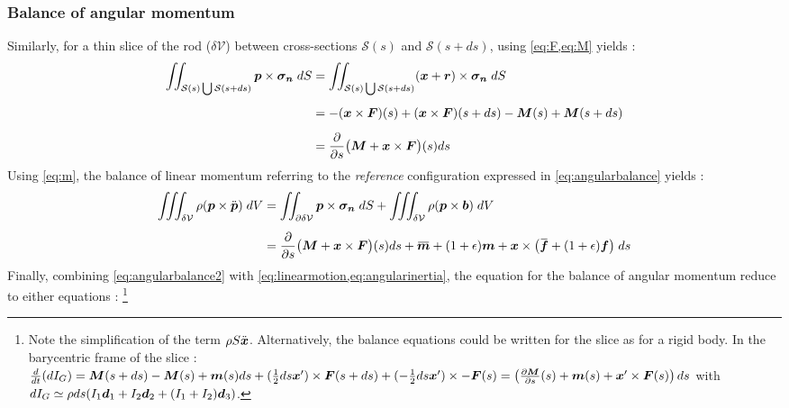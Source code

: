 \subsubsection{Balance of angular momentum}
Similarly, for a thin slice of the rod ($\delta\mathcal{V}$) between cross-sections $\mathcal{S}(s)$ and $\mathcal{S}(s+ds)$, using \cref{eq:F,eq:M} yields : 
\begin{equation}
	\begin{aligned}
		\iint_{\mathcal{S}(s) \bigcup \mathcal{S}(s+ds)} \boldsymbol{p} \times \boldsymbol{\sigma_n} \;dS
		&= \iint_{\mathcal{S}(s) \bigcup \mathcal{S}(s+ds)} (\boldsymbol{x} + \boldsymbol{r}) \times \boldsymbol{\sigma_n} \;dS
		\\[0.5em]
		&= -(\boldsymbol{x}\times\boldsymbol{F})(s) + (\boldsymbol{x}\times\boldsymbol{F})(s+ds) - \boldsymbol{M}(s) + \boldsymbol{M}(s+ds)
		\\[0.5em]
		&=  \frac{\partial}{\partial s} \big( \boldsymbol{M} + \boldsymbol{x}\times\boldsymbol{F} \big)(s) ds
	\end{aligned}
\end{equation}
Using \cref{eq:m}, the balance of linear momentum referring to the \emph{reference} configuration expressed in \cref{eq:angularbalance} yields : 
\begin{equation}
	\label{eq:angularbalance2}
	\begin{aligned}
		\iiint_{\delta\mathcal{V}} \rho (\vect{p} \times \ddot{\vect{p}}) \;dV  
		&=  \iint_{\partial\delta\mathcal{V}} \vect{p} \times \vect{\sigma_n} \;dS 
		+ \iiint_{\delta\mathcal{V}} \rho (\vect{p} \times \vect{b}) \;dV
		\\[0.5em]
		&= \frac{\partial}{\partial s} \big( \vect{M} + \vect{x}\times\vect{F} \big)(s) ds 
		+ \overbar{\vect{m}} + (1+\epsilon) \vect{m} + \vect{x} \times \big(\overbar{\vect{f}} + (1+\epsilon) \vect{f} \big) \;ds 
	\end{aligned}
\end{equation}
Finally, combining \cref{eq:angularbalance2} with \cref{eq:linearmotion,eq:angularinertia}, the equation for the balance of angular momentum reduce to either equations : \footnote{Note the simplification of the term $\rho S \ddot{\boldsymbol{x}}$. Alternatively, the balance equations could be written for the slice as for a rigid body. In the barycentric frame of the slice : $\frac{d}{dt}(dI_G) = \boldsymbol{M}(s+ds)-\boldsymbol{M}(s) + \boldsymbol{m}(s)ds + (\tfrac{1}{2}ds\boldsymbol{x}')\times \boldsymbol{F}(s+ds) + (-\tfrac{1}{2}ds\boldsymbol{x}')\times -\boldsymbol{F}(s) = \left(\frac{\partial \boldsymbol{M}}{\partial s}(s)+\boldsymbol{m}(s) + \boldsymbol{x}'\times \boldsymbol{F}(s)\right)ds$ with $dI_G \simeq \rho ds (I_1 \boldsymbol{d}_1 + I_2 \boldsymbol{d}_2 + (I_1+I_2) \boldsymbol{d}_3)$.}
